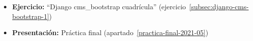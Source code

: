 \documentclass[a4paper,12pt]{article}
\begin{document}
 \begin{itemize}
   \item \textbf{Ejercicio:} ``Django cms\_bootstrap cuadrícula'' (ejercicio~\ref{subsec:django-cms-bootstrap-1})
   \item \textbf{Presentación:} Práctica final (apartado~\ref{practica-final-2021-05})
\end{itemize}





\end{document}

